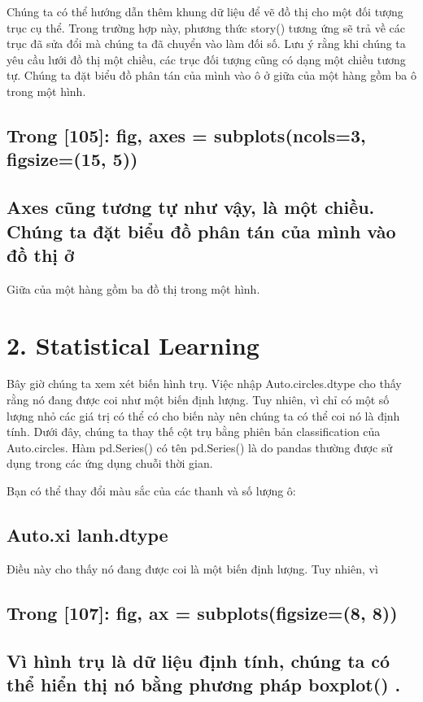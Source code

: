 Chúng ta có thể hướng dẫn thêm khung dữ liệu để vẽ đồ thị cho một đối tượng trục cụ thể. Trong trường hợp này, phương thức story() tương ứng sẽ trả về các trục đã sửa đổi mà chúng ta đã chuyển vào làm đối số. Lưu ý rằng khi chúng ta yêu cầu lưới đồ thị một chiều, các trục đối tượng cũng có dạng một chiều tương tự. Chúng ta đặt biểu đồ phân tán của mình vào ô ở giữa của một hàng gồm ba ô trong một hình.

\subsection{Trong [105]: fig, axes = subplots(ncols=3, figsize=(15, 5))}

\subsection{Axes cũng tương tự như vậy, là một chiều. Chúng ta đặt biểu đồ phân tán của mình vào đồ thị ở}

Giữa của một hàng gồm ba đồ thị trong một hình.

\section{2. Statistical Learning}

Bây giờ chúng ta xem xét biến hình trụ. Việc nhập Auto.circles.dtype cho thấy rằng nó đang được coi như một biến định lượng. Tuy nhiên, vì chỉ có một số lượng nhỏ các giá trị có thể có cho biến này nên chúng ta có thể coi nó là định tính. Dưới đây, chúng ta thay thế cột trụ bằng phiên bản classification của Auto.circles. Hàm pd.Series() có tên pd.Series() là do pandas thường được sử dụng trong các ứng dụng chuỗi thời gian.

Bạn có thể thay đổi màu sắc của các thanh và số lượng ô:

\subsection{Auto.xi lanh.dtype}

Điều này cho thấy nó đang được coi là một biến định lượng. Tuy nhiên, vì

\subsection{Trong [107]: fig, ax = subplots(figsize=(8, 8))}

\subsection{Vì hình trụ là dữ liệu định tính, chúng ta có thể hiển thị nó bằng phương pháp boxplot() .}


